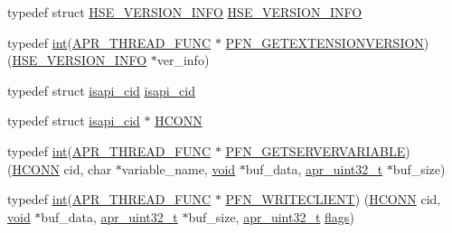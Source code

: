 \begin{DoxyCompactItemize}
\item 
typedef struct \hyperlink{structHSE__VERSION__INFO}{H\+S\+E\+\_\+\+V\+E\+R\+S\+I\+O\+N\+\_\+\+I\+N\+FO} \hyperlink{group__MOD__ISAPI_gad07c1b7a576befba3c9475d3336e944d}{H\+S\+E\+\_\+\+V\+E\+R\+S\+I\+O\+N\+\_\+\+I\+N\+FO}
\item 
typedef \hyperlink{pcre_8txt_a42dfa4ff673c82d8efe7144098fbc198}{int}(\hyperlink{group__apr__platform_gade8f829f9bd98fd4386894acf72edd7c}{A\+P\+R\+\_\+\+T\+H\+R\+E\+A\+D\+\_\+\+F\+U\+NC} $\ast$ \hyperlink{group__MOD__ISAPI_gae1915269bef3b791c1b876144f066e29}{P\+F\+N\+\_\+\+G\+E\+T\+E\+X\+T\+E\+N\+S\+I\+O\+N\+V\+E\+R\+S\+I\+ON}) (\hyperlink{structHSE__VERSION__INFO}{H\+S\+E\+\_\+\+V\+E\+R\+S\+I\+O\+N\+\_\+\+I\+N\+FO} $\ast$ver\+\_\+info)
\item 
typedef struct \hyperlink{structisapi__cid}{isapi\+\_\+cid} \hyperlink{group__MOD__ISAPI_ga15f6e4350a839bbb3ce4558c121b8766}{isapi\+\_\+cid}
\item 
typedef struct \hyperlink{structisapi__cid}{isapi\+\_\+cid} $\ast$ \hyperlink{group__MOD__ISAPI_ga3fd355d88d70287fd8783d066d69214e}{H\+C\+O\+NN}
\item 
typedef \hyperlink{pcre_8txt_a42dfa4ff673c82d8efe7144098fbc198}{int}(\hyperlink{group__apr__platform_gade8f829f9bd98fd4386894acf72edd7c}{A\+P\+R\+\_\+\+T\+H\+R\+E\+A\+D\+\_\+\+F\+U\+NC} $\ast$ \hyperlink{group__MOD__ISAPI_ga319435ec705ca43111348214b8f35c28}{P\+F\+N\+\_\+\+G\+E\+T\+S\+E\+R\+V\+E\+R\+V\+A\+R\+I\+A\+B\+LE}) (\hyperlink{group__MOD__ISAPI_ga3fd355d88d70287fd8783d066d69214e}{H\+C\+O\+NN} cid, char $\ast$variable\+\_\+name, \hyperlink{group__MOD__ISAPI_gacd6cdbf73df3d9eed42fa493d9b621a6}{void} $\ast$buf\+\_\+data, \hyperlink{group__apr__platform_ga558548a135d8a816c4787250744ea147}{apr\+\_\+uint32\+\_\+t} $\ast$buf\+\_\+size)
\item 
typedef \hyperlink{pcre_8txt_a42dfa4ff673c82d8efe7144098fbc198}{int}(\hyperlink{group__apr__platform_gade8f829f9bd98fd4386894acf72edd7c}{A\+P\+R\+\_\+\+T\+H\+R\+E\+A\+D\+\_\+\+F\+U\+NC} $\ast$ \hyperlink{group__MOD__ISAPI_ga758c7d2ac6216c22ab738d335874fc91}{P\+F\+N\+\_\+\+W\+R\+I\+T\+E\+C\+L\+I\+E\+NT}) (\hyperlink{group__MOD__ISAPI_ga3fd355d88d70287fd8783d066d69214e}{H\+C\+O\+NN} cid, \hyperlink{group__MOD__ISAPI_gacd6cdbf73df3d9eed42fa493d9b621a6}{void} $\ast$buf\+\_\+data, \hyperlink{group__apr__platform_ga558548a135d8a816c4787250744ea147}{apr\+\_\+uint32\+\_\+t} $\ast$buf\+\_\+size, \hyperlink{group__apr__platform_ga558548a135d8a816c4787250744ea147}{apr\+\_\+uint32\+\_\+t} \hyperlink{pcre_8txt_ad7a10cd81a384ff727296d05bb827806}{flags})

\end{DoxyCompactItemize}
